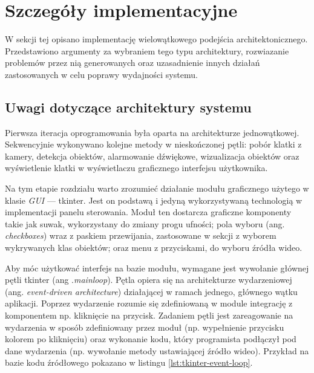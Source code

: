\section{Szczegóły implementacyjne}
\label{chap:szczegoly-implementacji}
W sekcji tej opisano implementację wielowątkowego podejścia architektonicznego. Przedstawiono argumenty za wybraniem tego typu architektury, rozwiazanie problemów przez nią generowanych oraz uzasadnienie innych działań zastosowanych w celu poprawy wydajności systemu.  

\subsection{Uwagi dotyczące architektury systemu}
Pierwsza iteracja oprogramowania była oparta na architekturze jednowątkowej. Sekwencyjnie wykonywano kolejne metody w nieskończonej pętli: pobór klatki z kamery, detekcja obiektów, alarmowanie dźwiękowe, wizualizacja obiektów oraz wyświetlenie klatki w wyświetlaczu graficznego interfejsu użytkownika.

Na tym etapie rozdziału warto zrozumieć działanie modułu graficznego użytego w klasie \emph{GUI} --- tkinter. 
Jest on podstawą i jedyną wykorzystywaną technologią w implementacji panelu sterowania. Moduł ten dostarcza graficzne komponenty takie jak suwak, wykorzystany do zmiany progu ufności; pola wyboru (ang. \emph{checkboxes}) wraz z paskiem przewijania, zastosowane w sekcji z wyborem wykrywanych klas obiektów; oraz menu z przyciskami, do wyboru źródła wideo. 

Aby móc użytkować interfejs na bazie modułu, wymagane jest wywołanie głównej pętli tkinter (ang .\emph{mainloop}). Pętla opiera się na architekturze wydarzeniowej (ang. \emph{event-driven architecture}) działającej w ramach jednego, głównego wątku aplikacji. Poprzez wydarzenie rozumie się zdefiniowaną w module integrację z komponentem np. kliknięcie na przycisk. Zadaniem pętli jest zareagowanie na wydarzenia w sposób zdefiniowany przez moduł (np. wypełnienie przycisku kolorem po kliknięciu) oraz wykonanie kodu, który programista podłączył pod dane wydarzenia (np. wywołanie metody ustawiającej źródło wideo). Przykład na bazie kodu źródłowego pokazano w listingu \ref{lst:tkinter-event-loop}.


